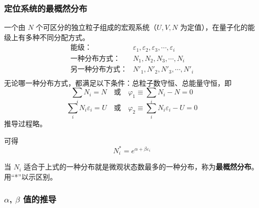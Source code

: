\subsubsection{定位系统的最概然分布}

一个由 $N$ 个可区分的独立粒子组成的宏观系统（$U, V, N$ 为定值），在量子化的能级上有多种不同分配方式。
$$\begin{aligned}
    \text{能级：}&\varepsilon_1, \varepsilon_2, \varepsilon_3, \cdots, \varepsilon_i \\
    \text{一种分布方式：}&N_1, N_2, N_3, \cdots, N_i \\
    \text{另一种分布方式：}&N'_1, N'_2, N'_3, \cdots, N'_i \\
\end{aligned}$$
无论哪一种分布方式，都满足以下条件：总粒子数守恒、总能量守恒，即
\begin{equation}
    \sum_{i} N_i = N \quad \text{或} \quad \varphi_1 \equiv \sum_{i} N_i - N = 0
    \label{DistributionParticleNumberConservation}
\end{equation}
\begin{equation}
    \sum_{i} N_i \varepsilon_i = U \quad \text{或} \quad \varphi_2 \equiv \sum_{i} N_i \varepsilon_i - U = 0
    \label{DistributionEnergyConservation}
\end{equation}
推导过程略。

可得
\begin{equation}
    N^*_i = e^{\alpha + \beta \varepsilon_i}
    \label{MostProbableDistribution}
\end{equation}

当 $N_i$ 适合于上式的一种分布就是微观状态数最多的一种分布，称为\textbf{最概然分布}。用“*”以示区别。

\subsubsection[alpha, beta值的推导]{$\alpha$, $\beta$ 值的推导}

